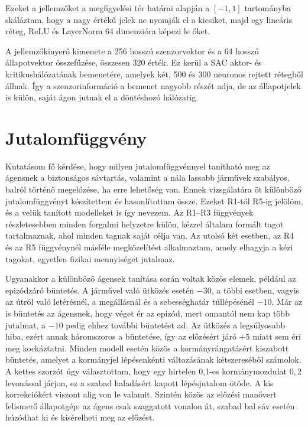 \documentclass[a4paper,12pt,oneside]{article}
\begin{document}
Ezeket a jellemzőket a megfigyelési tér határai alapján a $[-1,1]$ tartományba skáláztam,
hogy a nagy értékű jelek ne nyomják el a kicsiket, majd egy lineáris réteg,
ReLU és LayerNorm 64 dimenzióra képezi le őket.

A jellemzőkinyerő kimenete a 256 hosszú szenzorvektor és a 64 hosszú
állapotvektor összefűzése, összesen 320 érték. Ez kerül a SAC aktor- és
kritikushálózatának bemenetére, amelyek két, 500 és 300 neuronos rejtett
rétegből állnak. Így a szenzorinformáció a bemenet nagyobb részét adja, de
az állapotjelek is külön, saját ágon jutnak el a döntéshozó hálózatig.

\section{Jutalomfüggvény}
\label{sec:reward}

Kutatásom fő kérdése, hogy milyen jutalomfüggvénnyel tanítható meg az ágensnek a biztonságos
sávtartás, valamint a nála lassabb járművek szabályos, balról történő megelőzése, ha erre
lehetőség van. Ennek vizsgálatára öt különböző jutalomfüggvényt készítettem és hasonlítottam
össze. Ezeket R1-től R5-ig jelölöm, és a velük tanított modelleket is így nevezem.
Az R1--R3 függvények részletesebben minden forgalmi helyzetre külön, kézzel általam formált tagot tartalmaznak, ahol minden tagnak saját 
célja van. Az utolsó két esetben, az R4 és az R5 függvénynél másféle megközelítést alkalmaztam, amely elhagyja a kézi tagokat, egyetlen 
fizikai mennyiséget jutalmaz.

Ugyanakkor a különböző ágensek tanítása során voltak közös elemek, például az epizódzáró büntetés. A járművel 
való ütközés esetén $-30$, a többi esetben, vagyis az útról való letérésnél, a megállásnál és a sebességhatár túllépésénél $-10$.
Már az is büntetés az ágensnek, hogy véget ér az epizód, mert onnantól nem kap több jutalmat,
a $-10$ pedig ehhez további büntetést ad. Az ütközés a legsúlyosabb hiba, ezért annak háromszoros
a büntetése, így az előzésért járó $+5$ miatt sem éri meg kockáztatni.
Minden modell esetén közös a kormányrángatásért kiszabott büntetés, amelyet a kormányjel lépésenkénti
változásának kétszereséből számolok. A kettes szorzót úgy választottam, hogy
egy hirtelen 0,1-es kormánymozdulat $0{,}2$ levonással járjon, ez a szabad haladásért kapott
lépésjutalom ötöde. A kis korrekciókért viszont alig von le valamit. Szintén közös az előzési manővert felismerő állapotgép: az ágens csak szaggatott vonalon át, szabad bal sáv esetén húzódhat ki és kísérelheti meg az előzést.
\end{document}
